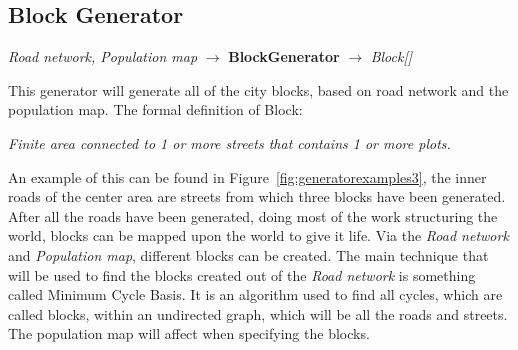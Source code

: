 \subsection{Block Generator}
\begin{center}
    \textit{Road network, Population map} $\rightarrow$ \textbf{BlockGenerator} $\rightarrow$ \textit{Block{[}{]}}
\end{center}
This generator will generate all of the city blocks, based on road network and the population map.
The formal definition of Block:
\begin{center}
    \textit{Finite area connected to 1 or more streets that contains 1 or more plots.}
\end{center}
An example of this can be found in Figure~\ref{fig:generatorexamples3}, the inner roads of the center area are streets from which three blocks have been generated.
After all the roads have been generated, doing most of the work structuring the world, blocks can be mapped upon the world to give it life.
Via the \textit{Road network} and \textit{Population map}, different blocks can be created. 
The main technique that will be used to find the blocks created out of the \textit{Road network} is something called Minimum Cycle Basis.
It is an algorithm used to find all cycles, which are called blocks, within an undirected graph, which will be all the roads and streets. 
The population map will affect when specifying the blocks. 